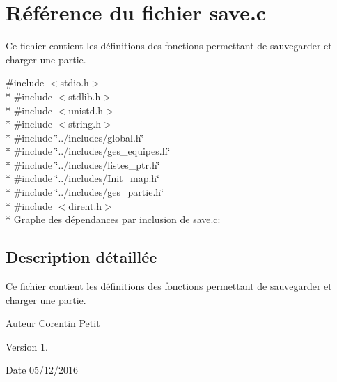 \hypertarget{a00029}{}\section{Référence du fichier save.\+c}
\label{a00029}


Ce fichier contient les définitions des fonctions permettant de sauvegarder et charger une partie.  


{\ttfamily \#include $<$stdio.\+h$>$}\\*
{\ttfamily \#include $<$stdlib.\+h$>$}\\*
{\ttfamily \#include $<$unistd.\+h$>$}\\*
{\ttfamily \#include $<$string.\+h$>$}\\*
{\ttfamily \#include \char`\"{}../includes/global.\+h\char`\"{}}\\*
{\ttfamily \#include \char`\"{}../includes/ges\+\_\+equipes.\+h\char`\"{}}\\*
{\ttfamily \#include \char`\"{}../includes/listes\+\_\+ptr.\+h\char`\"{}}\\*
{\ttfamily \#include \char`\"{}../includes/\+Init\+\_\+map.\+h\char`\"{}}\\*
{\ttfamily \#include \char`\"{}../includes/ges\+\_\+partie.\+h\char`\"{}}\\*
{\ttfamily \#include $<$dirent.\+h$>$}\\*
Graphe des dépendances par inclusion de save.\+c\+:


\subsection{Description détaillée}
Ce fichier contient les définitions des fonctions permettant de sauvegarder et charger une partie. 

\begin{DoxyAuthor}{Auteur}
Corentin Petit 
\end{DoxyAuthor}
\begin{DoxyVersion}{Version}
1. 
\end{DoxyVersion}
\begin{DoxyDate}{Date}
05/12/2016 
\end{DoxyDate}
